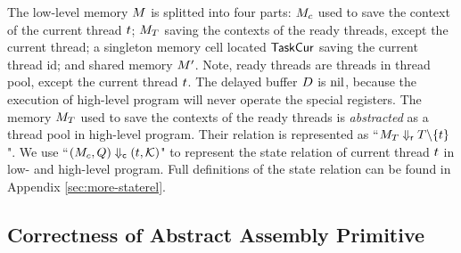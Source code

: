 The low-level memory $M$ is splitted into four parts: 
$M_c$ used to save the context of the current thread $t$; 
$M_T$ saving the contexts of the ready threads, 
except the current thread; a singleton memory 
cell located $\mathsf{TaskCur}$ saving the current thread id; and shared 
memory $M'$. Note, ready threads are threads in thread pool, 
except the current thread $t$. The delayed buffer $D$ is 
$\text{nil}$, because the execution of high-level program will never operate 
the special registers. The memory $M_T$ used to 
save the contexts of the ready threads is {\it abstracted} as a thread pool 
in high-level program. Their relation is represented as 
``${M_T} \Downarrow_{\textsf{r}} {T \backslash \{ t \}}$".  
We use ``${(M_c, Q)} \Downarrow_{\textsf{c}} {(t, \mathcal{K})}$" 
to represent the state relation of current thread $t$ 
in low- and high-level program. Full definitions of the state relation 
can be found in Appendix \ref{sec:more-staterel}. 

\subsection{Correctness of Abstract Assembly Primitive}
\label{subsec:correctness-primitive}

